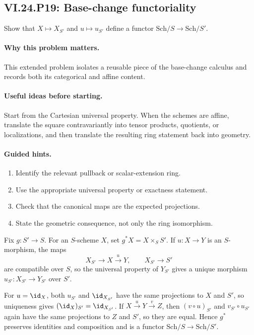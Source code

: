 \subsection*{VI.24.P19: Base-change functoriality}
\begin{problem}\label{prob:vi24-p19}
Show that $X\mapsto X_{S'}$ and $u\mapsto u_{S'}$ define a functor $\mathrm{Sch}/S\to\mathrm{Sch}/S'$.
\end{problem}

\ifdefined\FullProblemDossiers
\paragraph{Why this problem matters.}
This extended problem isolates a reusable piece of the base-change calculus and records both its categorical and affine content.

\paragraph{Useful ideas before starting.}
Start from the Cartesian universal property.  When the schemes are affine, translate the square contravariantly into tensor products, quotients, or localizations, and then translate the resulting ring statement back into geometry.

\paragraph{Guided hints.}
\begin{enumerate}
\item Identify the relevant pullback or scalar-extension ring.
\item Use the appropriate universal property or exactness statement.
\item Check that the canonical maps are the expected projections.
\item State the geometric consequence, not only the ring isomorphism.
\end{enumerate}

\begin{solution}
Fix $g:S'\to S$.  For an $S$-scheme $X$, set $g^*X=X\times_SS'$.  If $u:X\to Y$ is an $S$-morphism, the maps
\[
X_{S'}\to X\xrightarrow{u}Y,
\qquad X_{S'}\to S'
\]
are compatible over $S$, so the universal property of $Y_{S'}$ gives a unique morphism
$u_{S'}:X_{S'}\to Y_{S'}$ over $S'$.

For $u=\id_X$, both $u_{S'}$ and $\id_{X_{S'}}$ have the same projections to $X$ and $S'$, so uniqueness gives $(\id_X)_{S'}=\id_{X_{S'}}$.  If $X\xrightarrow uY\xrightarrow vZ$, then $(v\circ u)_{S'}$ and $v_{S'}\circ u_{S'}$ again have the same projections to $Z$ and $S'$, so they are equal.  Hence $g^*$ preserves identities and composition and is a functor $\mathrm{Sch}/S\to\mathrm{Sch}/S'$.
\end{solution}

